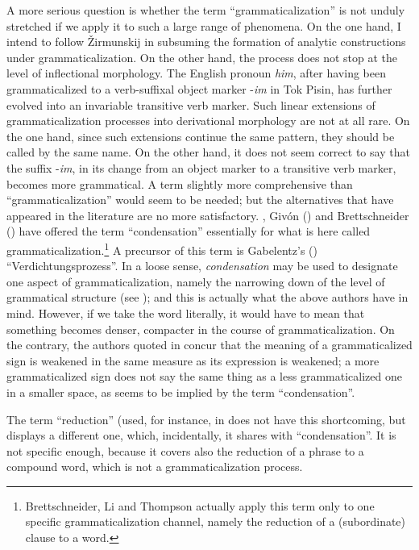 A more serious question is whether the term ``grammaticalization'' is not unduly stretched if we apply it to such a large range of phenomena. On the one hand, I intend to follow Žirmunskij in subsuming the formation of analytic constructions under grammaticalization. On the other hand, the process does not stop at the level of inflectional morphology. The English pronoun \textit{him}, after having been grammaticalized to a verb-suffixal object marker -\textit{im} in Tok Pisin, has further evolved into an invariable transitive verb marker. Such linear extensions of grammaticalization processes into derivational morphology are not at all rare. On the one hand, since such extensions continue the same pattern, they should be called by the same name. On the other hand, it does not seem correct to say that the suffix -\textit{im}, in its change from an object marker to a transitive verb marker, becomes more grammatical. A term slightly more comprehensive than ``grammaticalization'' would seem to be needed; but the alternatives that have appeared in the literature are no more satisfactory.\label{page12} \citet{LiEtAL1974}, Givón (\citeyear[209]{Givón1979b}) and Brettschneider (\citeyear[94]{BrettschneiderEtAl1980}) 
have offered the term ``condensation'' essentially for what is here called grammaticalization.\footnote{Brettschneider, Li and Thompson actually apply this term only to one specific grammaticalization channel, namely the reduction of a (subordinate) clause to a word.} A precursor of this term is Gabelentz's (\citeyear[433, 436]{Gabelentz1891}) ``Verdichtungsprozess''. In a loose sense, \textit{condensation} may be used to designate one aspect of grammaticalization, namely the narrowing down of the level of grammatical structure (see ); and this is actually what the above authors have in mind.\label{page12b} However, if we take the word literally, it would have to mean that something becomes denser, compacter in the course of grammaticalization. On the contrary, the authors quoted in  concur that the meaning of a grammaticalized sign is weakened in the same measure as its expression is weakened; a more grammaticalized sign does not say the same thing as a less grammaticalized one in a smaller space, as seems to be implied by the term ``condensation''.

The term ``reduction'' (used, for instance, in \citep[103--107]{Langacker1977} does not have this shortcoming, but displays a different one, which, incidentally, it shares with ``condensation''. It is not specific enough, because it covers also the reduction of a phrase to a compound word, which is not a grammaticalization process.

